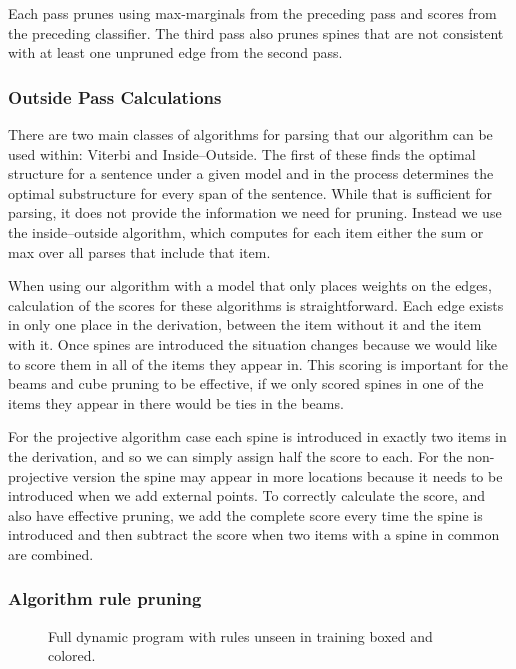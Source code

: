 Each pass prunes using max-marginals from the preceding pass and scores from the preceding classifier.
The third pass also prunes spines that are not consistent with at least one unpruned edge from the second pass.

\subsubsection{Outside Pass Calculations}

There are two main classes of algorithms for parsing that our algorithm can be used within: Viterbi and Inside--Outside.
The first of these finds the optimal structure for a sentence under a given model and in the process determines the optimal substructure for every span of the sentence.
While that is sufficient for parsing, it does not provide the information we need for pruning.
Instead we use the inside--outside algorithm, which computes for each item either the sum or max over all parses that include that item.

When using our algorithm with a model that only places weights on the edges, calculation of the scores for these algorithms is straightforward.
Each edge exists in only one place in the derivation, between the item without it and the item with it.
Once spines are introduced the situation changes because we would like to score them in all of the items they appear in.
This scoring is important for the beams and cube pruning to be effective, if we only scored spines in one of the items they appear in there would be ties in the beams.

For the projective algorithm case each spine is introduced in exactly two items in the derivation, and so we can simply assign half the score to each.
For the non-projective version the spine may appear in more locations because it needs to be introduced when we add external points.
To correctly calculate the score, and also have effective pruning, we add the complete score every time the spine is introduced and then subtract the score when two items with a spine in common are combined.

\subsubsection{Algorithm rule pruning}

\begin{figure*}
\vspace{-5mm}

\vspace{-12mm}
\caption{\label{fig:rules-pruned}
Full dynamic program with rules unseen in training boxed and colored.
}
\end{figure*}

